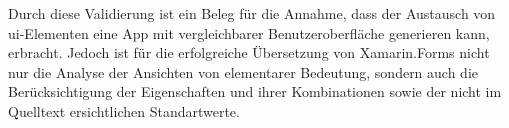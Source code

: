 Durch diese Validierung ist ein Beleg für die Annahme,  dass der Austausch von \ac{ui}-Elementen eine App mit vergleichbarer Benutzeroberfläche generieren kann,  erbracht. Jedoch ist für die erfolgreiche Übersetzung von Xamarin.Forms nicht nur die Analyse der Ansichten von elementarer Bedeutung, sondern auch die Berücksichtigung der Eigenschaften und ihrer Kombinationen sowie der nicht im Quelltext ersichtlichen Standartwerte.


